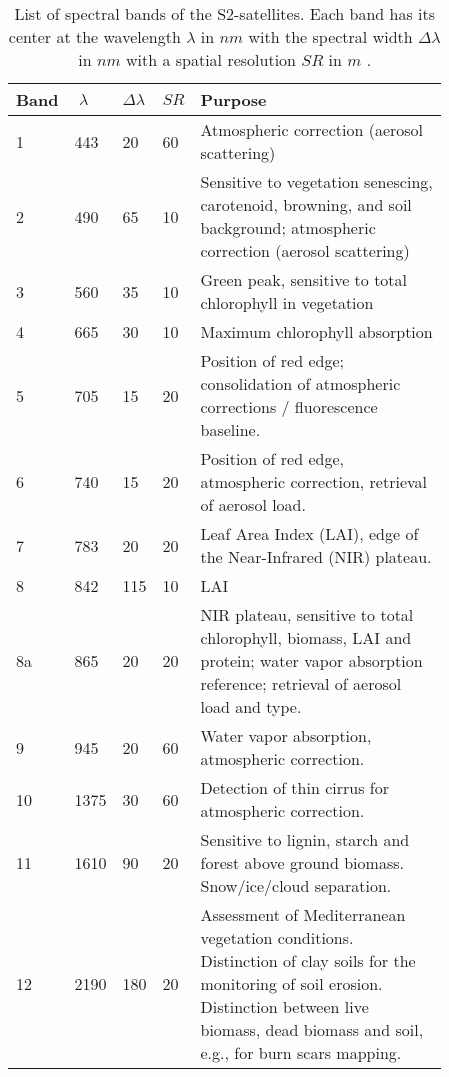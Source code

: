 \begin{table}[h]
    \centering
    \small
    \caption[List of spectral bands of the S2-satellites.]{List of spectral bands of the S2-satellites. Each band has its center at the wavelength $\lambda$ in $nm$ with the spectral width $\Delta\lambda$ in $nm$ with a spatial resolution $SR$ in $m$ \citep{jaramazESASentinel2Mission2013}.}
    \begin{tabular}{p{0.03\linewidth} p{0.04\linewidth} p{0.03\linewidth} p{0.03\linewidth} p{0.73\linewidth}}
    \toprule
        \hspace*{-5pt} Band & $\;\lambda$ & $\Delta\lambda$ & $SR$ & Purpose \\ \hline
        1 & 443 & 20 & 60 & Atmospheric correction (aerosol scattering) \\ %
        2 & 490 & 65 & 10 & Sensitive to vegetation senescing, carotenoid, browning, and soil background; atmospheric correction (aerosol scattering) \\ %
        3 & 560 & 35 & 10 & Green peak, sensitive to total chlorophyll in vegetation \\ %
        4 & 665 & 30 & 10 & Maximum chlorophyll absorption \\ %
        5 & 705 & 15 & 20 & Position of red edge; consolidation of atmospheric corrections / fluorescence baseline. \\ %
        6 & 740 & 15 & 20 & Position of red edge, atmospheric correction, retrieval of aerosol load. \\ %
        7 & 783 & 20 & 20 & Leaf Area Index (LAI), edge of the Near-Infrared (NIR) plateau. \\ %
        8 & 842 & 115 & 10 & LAI \\ %
        8a & 865 & 20 & 20 & NIR plateau, sensitive to total chlorophyll, biomass, LAI and protein; water vapor absorption reference; retrieval of aerosol load and type. \\ %
        9 & 945 & 20 & 60 & Water vapor absorption, atmospheric correction. \\ %
        10 & 1375 & 30 & 60 & Detection of thin cirrus for atmospheric correction. \\ %
        11 & 1610 & 90 & 20 & Sensitive to lignin, starch and forest above ground biomass. Snow/ice/cloud separation. \\ %
        12 & 2190 & 180 & 20 & Assessment of Mediterranean vegetation conditions. Distinction of clay soils for the monitoring of soil erosion. Distinction between live biomass, dead biomass and soil, e.g., for burn scars mapping. \\
        \bottomrule
    \end{tabular}
    \label{table:S2-bands}
\end{table}
